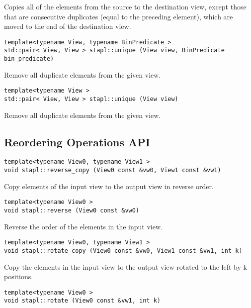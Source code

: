 Copies all of the elements from the source to the destination view, except those that are consecutive duplicates (equal to the preceding element), which are moved to the end of the destination view.

\begin{verbatim}
template<typename View, typename BinPredicate >
std::pair< View, View > stapl::unique (View view, BinPredicate bin_predicate)
\end{verbatim}

Remove all duplicate elements from the given view.

\begin{verbatim}
template<typename View >
std::pair< View, View > stapl::unique (View view)
\end{verbatim}

Remove all duplicate elements from the given view.


\subsection{Reordering Operations API} \label{sec-reord-alg}

\begin{verbatim}
template<typename View0, typename View1 >
void stapl::reverse_copy (View0 const &vw0, View1 const &vw1)
\end{verbatim}

Copy elements of the input view to the output view in reverse order.

\begin{verbatim}
template<typename View0 >
void stapl::reverse (View0 const &vw0)
\end{verbatim}

Reverse the order of the elements in the input view.

\begin{verbatim}
template<typename View0, typename View1 >
void stapl::rotate_copy (View0 const &vw0, View1 const &vw1, int k)
\end{verbatim}

Copy the elements in the input view to the output view rotated to the left by k positions.

\begin{verbatim}
template<typename View0 >
void stapl::rotate (View0 const &vw1, int k)
\end{verbatim}

